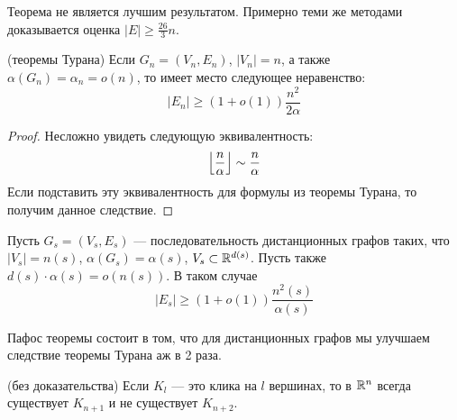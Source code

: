 \begin{note}
	Теорема не является лучшим результатом. Примерно теми же методами доказывается оценка $|E| \ge \frac{26}{3}n$.
\end{note}

\begin{corollary} (теоремы Турана)
	Если $G_n = (V_n, E_n)$, $|V_n| = n$, а также $\alpha(G_n) = \alpha_n = o(n)$, то имеет место следующее неравенство:
	\[
		|E_n| \ge (1 + o(1))\frac{n^2}{2\alpha}
	\]
\end{corollary}

\begin{proof}
	Несложно увидеть следующую эквивалентность:
	\[
		\left\lfloor \frac{n}{\alpha} \right\rfloor \sim \frac{n}{\alpha}
	\]
	Если подставить эту эквивалентность для формулы из теоремы Турана, то получим данное следствие.
\end{proof}

\begin{theorem}
	Пусть $G_s = (V_s, E_s)$ --- последовательность дистанционных графов таких, что $|V_s| = n(s)$, $\alpha(G_s) = \alpha(s)$, $V_s \subset \mathbb{R}^{d(s)}$. Пусть также $d(s) \cdot \alpha(s) = o(n(s))$. В таком случае
	\[
		|E_s| \ge (1 + o(1)) \frac{n^2(s)}{\alpha(s)}
	\]
\end{theorem}

\begin{note}
	Пафос теоремы состоит в том, что для дистанционных графов мы улучшаем следствие теоремы Турана аж в 2 раза.
\end{note}

\begin{lemma} (без доказательства)
	Если $K_l$ --- это клика на $l$ вершинах, то в $\mathbb{R}^n$ всегда существует $K_{n + 1}$ и не существует $K_{n + 2}$.
\end{lemma}


